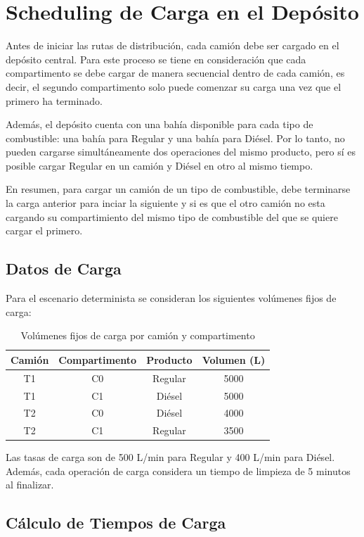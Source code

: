 \section{Scheduling de Carga en el Depósito}

Antes de iniciar las rutas de distribución, cada camión debe ser cargado en el depósito central. Para este proceso se tiene en consideración que cada compartimento se debe cargar de manera secuencial dentro de cada camión, es decir, el segundo compartimento solo puede comenzar su carga una vez que el primero ha terminado.

Además, el depósito cuenta con una bahía disponible para cada tipo de combustible: una bahía para Regular y una bahía para Diésel. Por lo tanto, no pueden cargarse simultáneamente dos operaciones del mismo producto, pero sí es posible cargar Regular en un camión y Diésel en otro al mismo tiempo.

En resumen, para cargar un camión de un tipo de combustible, debe terminarse la carga anterior para inciar la siguiente y si es que el otro camión no esta cargando su compartimiento del mismo tipo de combustible del que se quiere cargar el primero.

\subsection{Datos de Carga}

Para el escenario determinista se consideran los siguientes volúmenes fijos de carga:

\begin{table}[H]
\centering
\caption{Volúmenes fijos de carga por camión y compartimento}
\begin{tabular}{cccc}
\toprule
Camión & Compartimento & Producto & Volumen (L) \\
\midrule
T1 & C0 & Regular & 5000 \\
T1 & C1 & Diésel & 5000 \\
T2 & C0 & Diésel & 4000 \\
T2 & C1 & Regular & 3500 \\
\bottomrule
\end{tabular}
\end{table}

Las tasas de carga son de 500 L/min para Regular y 400 L/min para Diésel. Además, cada operación de carga considera un tiempo de limpieza de 5 minutos al finalizar.

\subsection{Cálculo de Tiempos de Carga}

